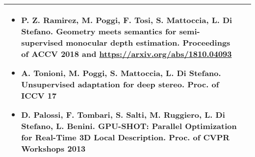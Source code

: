 \begin{center}
\begin{tabular}{|p{}|p{}|}
{\begin{itemize}
\item P. Z. Ramirez, M. Poggi, F. Tosi, S. Mattoccia, L. Di Stefano. Geometry meets semantics for semi-supervised monocular depth estimation. Proceedings of ACCV 2018 and \href{arXiv:1810.0493}{https://arxiv.org/abs/1810.04093}
\item A. Tonioni, M. Poggi, S. Mattoccia, L. Di Stefano. Unsupervised adaptation for deep stereo. 
Proc. of ICCV 17%
\item D. Palossi, F. Tombari, S. Salti, M. Ruggiero, L. Di Stefano, L. Benini. GPU-SHOT: Parallel Optimization for Real-Time 3D Local Description. Proc. of CVPR Workshops 2013%
\end{itemize}}\tabularnewline\bottomrule

\end{tabular}
\end{center}
 